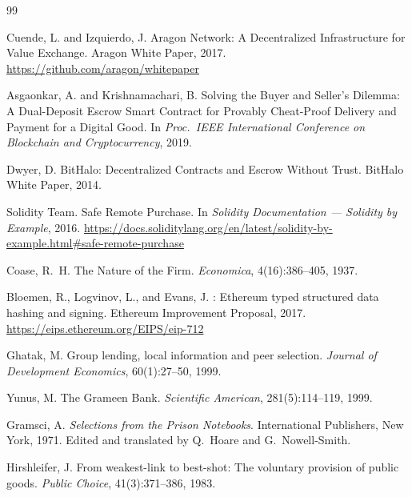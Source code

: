 \documentclass[11pt,a4paper]{article}
\theoremstyle{definition}
\theoremstyle{remark}
\begin{document}
\begin{thebibliography}{99}

Cuende, L. and Izquierdo, J.
\newblock Aragon Network: A Decentralized Infrastructure for Value Exchange.
\newblock Aragon White Paper, 2017.
\newblock \url{https://github.com/aragon/whitepaper}

Asgaonkar, A. and Krishnamachari, B.
\newblock Solving the Buyer and Seller's Dilemma: A Dual-Deposit Escrow Smart
  Contract for Provably Cheat-Proof Delivery and Payment for a Digital Good.
\newblock In \emph{Proc.\ IEEE International Conference on Blockchain and
  Cryptocurrency}, 2019.

Dwyer, D.
\newblock BitHalo: Decentralized Contracts and Escrow Without Trust.
\newblock BitHalo White Paper, 2014.

Solidity Team.
\newblock Safe Remote Purchase.
\newblock In \emph{Solidity Documentation --- Solidity by Example}, 2016.
\newblock \url{https://docs.soliditylang.org/en/latest/solidity-by-example.html#safe-remote-purchase}

Coase, R.~H.
\newblock The Nature of the Firm.
\newblock \emph{Economica}, 4(16):386--405, 1937.

Bloemen, R., Logvinov, L., and Evans, J.
: Ethereum typed structured data hashing and signing.
\newblock Ethereum Improvement Proposal, 2017.
\newblock \url{https://eips.ethereum.org/EIPS/eip-712}

Ghatak, M.
\newblock Group lending, local information and peer selection.
\newblock \emph{Journal of Development Economics}, 60(1):27--50, 1999.

Yunus, M.
\newblock The Grameen Bank.
\newblock \emph{Scientific American}, 281(5):114--119, 1999.

Gramsci, A.
\newblock \emph{Selections from the Prison Notebooks}.
\newblock International Publishers, New York, 1971.
\newblock Edited and translated by Q.~Hoare and G.~Nowell-Smith.

Hirshleifer, J.
\newblock From weakest-link to best-shot: The voluntary provision of public
  goods.
\newblock \emph{Public Choice}, 41(3):371--386, 1983.


\end{thebibliography}
\end{document}
